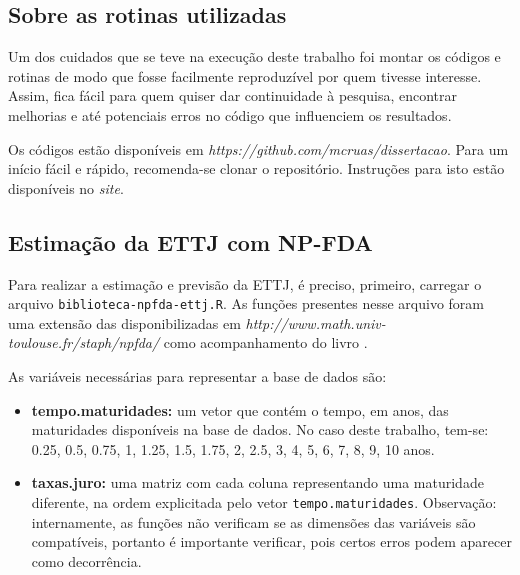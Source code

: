 \documentclass[
	12pt,				%
	openright,			%
	oneside,			%
	a4paper,			%
	english,			%
	brazil				%
	]{dissertacao-ufrgs-abntex2}
\begin{document}
\begin{apendicesenv}
%
\partapendices
%

\chapter{Sobre as rotinas utilizadas} \label{apend:rotinas}


Um dos cuidados que se teve na execução deste trabalho foi montar os códigos e rotinas de modo que fosse facilmente reproduzível por quem tivesse interesse. Assim, fica fácil para quem quiser dar continuidade à pesquisa, encontrar melhorias e até potenciais erros no código que influenciem os resultados.

Os códigos estão disponíveis em \emph{https://github.com/mcruas/dissertacao}. Para um início fácil e rápido, recomenda-se clonar o repositório. Instruções para isto estão disponíveis no \emph{site}.

\section{Estimação da ETTJ com NP-FDA}
Para realizar a estimação e previsão da ETTJ, é preciso, primeiro, carregar o arquivo \texttt{biblioteca-npfda-ettj.R}. As funções presentes nesse arquivo foram uma extensão das disponibilizadas em \emph{http://www.math.univ-toulouse.fr/staph/npfda/} como acompanhamento do livro .

As variáveis necessárias para representar a base de dados são:
\begin{itemize}
\item \textbf{tempo.maturidades:} um vetor que contém o tempo, em anos, das maturidades disponíveis na base de dados. No caso deste trabalho, tem-se:
0.25, 0.5, 0.75, 1,  1.25,  1.5,  1.75,	2,	2.5,	3,	4,	5,	6,	7,	8,	9,	10 anos.
\item \textbf{taxas.juro:} uma matriz com cada coluna representando uma maturidade diferente, na ordem explicitada pelo vetor \texttt{tempo.maturidades}. Observação: internamente, as funções não verificam se as dimensões das variáveis são compatíveis, portanto é importante verificar, pois certos erros podem aparecer como decorrência.
\end{itemize}


\end{apendicesenv}
\end{document}
